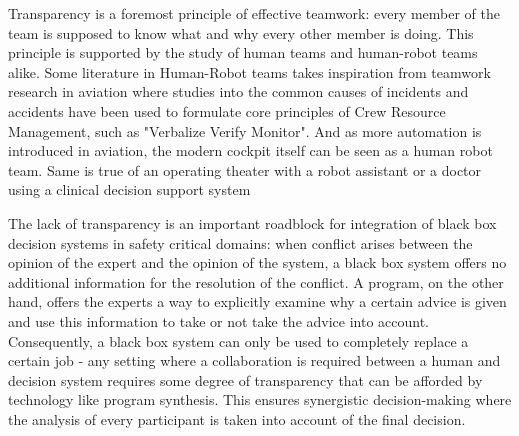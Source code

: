 Transparency is a foremost principle of effective teamwork: every member of the team is supposed to know what and why every other member is doing. 
This principle is supported by the study of human teams \cite{bagPeerTransparencyTeams2012, solomonInferenceTransparencyEffective2021} and human-robot teams \cite{ezenyilimbaImpactTransparencyExplanations2022, guznovRobotTransparencyTeam2019, holderDesigningBiDirectionalTransparency2021, lakhmaniExploringEffectCommunication2019, lakhmaniProposedApproachDetermining2016, mercadoIntelligentAgentTransparency2016, ososkyDeterminantsSystemTransparency2014, panganibanTransparencyAutonomousTeammates2020, ronconeTransparentRoleAssignment2017} alike.
Some literature in Human-Robot teams takes inspiration \cite{shivelyCrewResourceManagement2018} from teamwork research in aviation where studies into the common causes of incidents and accidents \cite{chidesterPersonalityFactorsFlight1990, chidesterPilotPersonalityCrew1991, smithSimulatorStudyInteraction1979} have been used to formulate core principles of Crew Resource Management, such as "Verbalize Verify Monitor".
And as more automation is introduced in aviation, the modern cockpit itself can be seen as a human robot team.
Same is true of an operating theater with a robot assistant \cite{weerarathnaHumanRobotCollaborationHealthcare2023} or a doctor using a clinical decision support system \cite{castilloConsiderationsSuccessfulClinical2013, mooreIntroductionClinicalDecision2011, osullivanDecisionTimeClinical2014, purcellWhatMakesGood2005, sakallarisClinicalDecisionSupport2000, selfClinicalDecisionSupport2008, stangeThisIssueClinical2011, wrightClinicalDecisionSupport2009}

The lack of transparency is an important roadblock for integration of black box decision systems in safety critical domains: when conflict arises between the opinion of the expert and the opinion of the system, a black box system offers no additional information for the resolution of the conflict. 
A program, on the other hand, offers the experts a way to explicitly examine why a certain advice is given and use this information to take or not take the advice into account. 
Consequently, a black box system can only be used to completely replace a certain job - any setting where a collaboration is required between a human and decision system requires some degree of transparency that can be afforded by technology like program synthesis. 
This ensures synergistic decision-making where the analysis of every participant is taken into account of the final decision.

